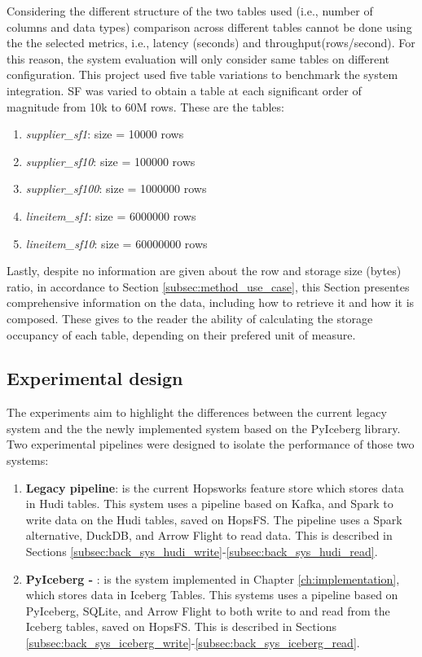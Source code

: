 Considering the different structure of the two tables used (i.e., number of columns and data types) comparison across different tables cannot be done using the the selected metrics, i.e., latency (seconds) and throughput(rows/second). For this reason, the system evaluation will only consider same tables on different configuration. This project used five table variations to benchmark the system integration. \gls{SF} was varied to obtain a table at each significant order of magnitude from 10k to 60M rows. These are the tables:
\begin{enumerate}
    \item \textit{supplier\_sf1}: size = 10000 rows
    \item \textit{supplier\_sf10}: size = 100000 rows
    \item \textit{supplier\_sf100}: size = 1000000 rows
    \item \textit{lineitem\_sf1}: size = 6000000 rows
    \item \textit{lineitem\_sf10}: size = 60000000 rows
\end{enumerate}

Lastly, despite no information are given about the row and storage size (bytes) ratio, in accordance to Section \ref{subsec:method_use_case}, this Section presentes comprehensive information on the data, including how to retrieve it and how it is composed. These gives to the reader the ability of calculating the storage occupancy of each table, depending on their prefered unit of measure.



\subsection{Experimental design}
\label{subsec:experimental_design}

The experiments aim to highlight the differences between the current legacy system and the the newly implemented system based on the PyIceberg library. Two experimental pipelines were designed to isolate the performance of those two systems:
\begin{enumerate}
  \item \textbf{Legacy pipeline}: is the current Hopsworks feature store which stores data in Hudi tables. This system uses a pipeline based on Kafka, and Spark to write data on the Hudi tables, saved on \gls{HopsFS}. The pipeline uses a Spark alternative, DuckDB, and Arrow Flight to read data. This is described in Sections \ref{subsec:back_sys_hudi_write}-\ref{subsec:back_sys_hudi_read}.
  \item \textbf{PyIceberg - }: is the system implemented in Chapter \ref{ch:implementation}, which stores data in Iceberg Tables. This systems uses a pipeline based on PyIceberg, SQLite, and Arrow Flight to both write to and read from the Iceberg tables, saved on \gls{HopsFS}. This is described in Sections \ref{subsec:back_sys_iceberg_write}-\ref{subsec:back_sys_iceberg_read}.
\end{enumerate}

